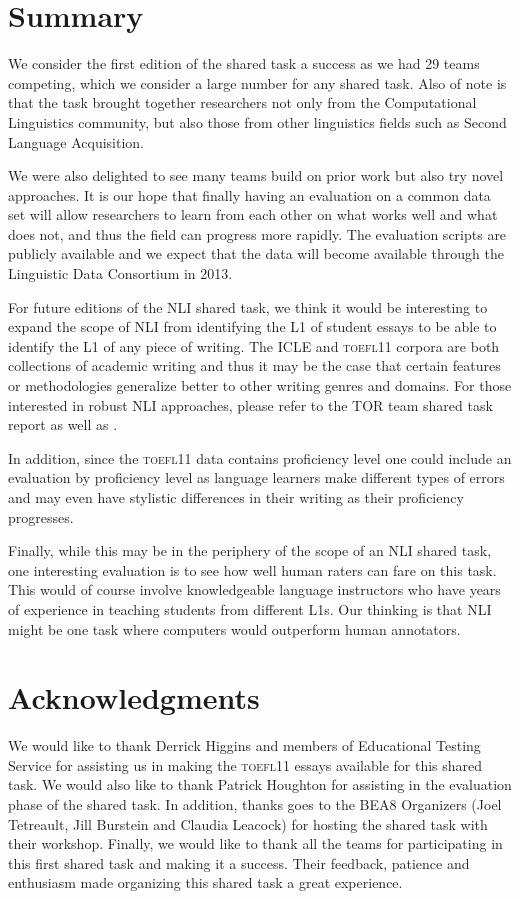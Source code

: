 \documentclass[11pt,letterpaper]{article}
\begin{document}
\section{Summary}
\label{sec-summary}
We consider the first edition of the shared task a success as we had
29 teams competing, which we consider a large number for any
shared task.  Also of note is that the task brought together
researchers not only from the Computational Linguistics community,
but also those from other linguistics fields such as Second
Language Acquisition.

We were also delighted to see many teams build on
prior work but also try novel approaches.  It is our hope that
finally having an evaluation on a common data set 
will allow researchers to learn from each
other on what works well and what does not, and thus the
field can progress more rapidly.  The evaluation scripts are
publicly available and we expect that the data will become
available through the Linguistic Data Consortium in 2013.

For future editions of the NLI shared task, we think it would be
interesting to expand the scope of NLI from identifying the L1
of student essays to be able to identify the L1 of any piece of
writing.  The ICLE and \textsc{toefl11} corpora are both
collections of academic writing and thus it may be the case that
certain features or methodologies generalize better to other
writing genres and domains.  For those interested in robust
NLI approaches, please refer to the TOR team shared task report
as well as .

In addition, since the \textsc{toefl11} data contains proficiency level
one could include an evaluation by
proficiency level
as language learners make different types of errors
and may even have stylistic differences in their writing as their
proficiency progresses.

Finally, while this may be in the periphery of the scope of an
NLI shared task, one interesting evaluation is to see how well
human raters can fare on this task.  This would of course involve
knowledgeable language instructors who have years of experience
in teaching students from different L1s.  Our thinking is that NLI
might be one task where computers would outperform human annotators.

\section*{Acknowledgments}
We would like to thank Derrick Higgins and members of Educational
Testing Service for assisting us in making the \textsc{toefl11} essays
available for this shared task.  We would also like to thank
Patrick Houghton for assisting in the evaluation phase of the shared task.
In addition, thanks goes to the BEA8 Organizers (Joel Tetreault,
Jill Burstein and Claudia Leacock) for hosting the shared
task with their workshop.  Finally, we would like to thank all the teams for
participating in this first shared task and making it a success.
Their feedback, patience and enthusiasm made organizing this
shared task a great experience.








\appendix
\end{document}
